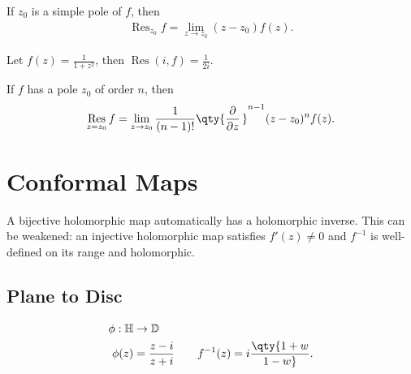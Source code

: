 \begin{proposition}

If \(z_0\) is a simple pole of \(f\), then
\begin{align*}  
\mathop{\mathrm{Res}}_{z_0}f = \lim_{z\to z_0} (z-z_0) f(z)
.\end{align*}

\end{proposition}

\begin{example}

Let \(f(z) = \frac{1}{1+z^2}\), then
\(\mathop{\mathrm{Res}}(i, f) = \frac{1}{2i}\).

\end{example}

\begin{proposition}

If \(f\) has a pole \(z_0\) of order \(n\), then
\begin{align*}  
\mathop{\mathrm{Res}}_{z=z_0} f = \lim_{z\to z_0} {1 \over (n-1)!} \qty{{\frac{\partial }{\partial z}\,}}^{n-1} (z-z_0)^n f(z)
.\end{align*}

\end{proposition}

\hypertarget{conformal-maps}{%
\section{Conformal Maps}\label{conformal-maps}}

\begin{fact}

A bijective holomorphic map automatically has a holomorphic inverse.
This can be weakened: an injective holomorphic map satisfies
\(f'(z) \neq 0\) and \(f ^{-1}\) is well-defined on its range and
holomorphic.

\end{fact}

\hypertarget{plane-to-disc}{%
\subsection{Plane to Disc}\label{plane-to-disc}}

\begin{align*}
\phi: {\mathbb{H}}&\to {\mathbb{D}}\\
\phi(z) &= {z - i \over z + i} \qquad f^{-1}(z) = i\qty{1 + w \over 1 - w}
.\end{align*}

